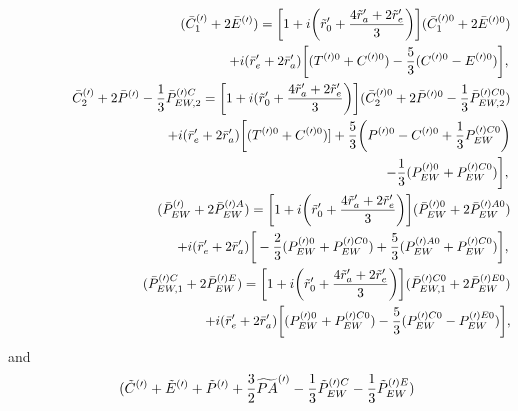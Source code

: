 \documentclass[aps,preprint,floats,epsf,epsfig,nofootinbib,letter]{revtex4}
\newcommand{\be}{\begin{eqnarray}}
\newcommand{\en}{\end{eqnarray}}
\newcommand{\non}{{\nonumber}}
\begin{document}
\begin{eqnarray}
\non\\
&&(\bar C^{(\prime)}_1+2\bar E^{(\prime)})
=\bigg[1+i\bigg(\tilde r'_0 +\frac{4\tilde r'_a +2\tilde r'_e}{3}\bigg)\bigg](\bar C^{(\prime)0}_1+2\bar E^{(\prime)0})
\non\\
&&\qquad\qquad\qquad\quad
+i(\bar r'_e+2\bar r'_a) \bigg[(T^{(\prime)0}+C^{(\prime)0})-\frac{5}{3}(C^{(\prime)0}- E^{(\prime)0})\bigg],
\non\\
%
&&
\bar C^{(\prime)}_2+2\bar P^{(\prime)}-\frac{1}{3}\bar P^{(\prime)C}_{EW,2}
=\bigg[1+i(\tilde r'_0 +\frac{4\tilde r'_a +2\tilde r'_e}{3}\bigg)\bigg]
(\bar C^{(\prime)0}_2+2\bar P^{(\prime)0}-\frac{1}{3}\bar P^{(\prime)C0}_{EW,2})
\non\\
&&\qquad\qquad\qquad\qquad\qquad\quad
+i(\bar r'_e+2\bar r'_a) \bigg[(T^{(\prime)0}+C^{(\prime)0})]
+\frac{5}{3} \bigg(P^{(\prime)0}-C^{(\prime)0}+\frac{1}{3}P^{(\prime)C0}_{EW}\bigg)
\non\\
&&\qquad\qquad\qquad\qquad\qquad\quad
-\frac{1}{3} (P^{(\prime)0}_{EW}+P^{(\prime)C0}_{EW})\bigg],
\non\\
&&(\bar P^{(\prime)}_{EW} +2\bar P^{(\prime)A}_{EW})
=
\bigg[1+i\bigg(\tilde r'_0 +\frac{4\tilde r'_a +2\tilde r'_e}{3}\bigg)\bigg]
(\bar P^{(\prime)0}_{EW} +2\bar P^{(\prime)A0}_{EW})
\non\\
&&\qquad\qquad\qquad\qquad
+i(\bar r'_e+2\bar r'_a)\bigg[-\frac{2}{3} (P^{(\prime)0}_{EW}+P^{(\prime)C0}_{EW})+\frac{5}{3} (P^{(\prime)A0}_{EW}+P^{(\prime)C0}_{EW})\bigg],
\non\\
&&(\bar P^{(\prime)C}_{EW,1}+2\bar P^{(\prime)E}_{EW})
=
\bigg[1+i\bigg(\tilde r'_0 +\frac{4\tilde r'_a +2\tilde r'_e}{3}\bigg)\bigg]
(\bar P^{(\prime)C0}_{EW,1}  +2\bar P^{(\prime)E0}_{EW})
\non\\
&&\qquad\qquad\qquad\qquad
+
i(\bar r'_e+2\bar r'_a) \bigg[(P^{(\prime)0}_{EW}+P^{(\prime)C0}_{EW})-\frac{5}{3} (P^{(\prime)C0}_{EW}-P^{(\prime)E0}_{EW})\bigg],
\label{eq: rcombinations2}
\en
and
\be
&&(\tilde C^{(\prime)}+\tilde E^{(\prime)}+\tilde P^{(\prime)}+\frac{3}{2}\widetilde {PA}^{(\prime)}-\frac{1}{3}\tilde P^{(\prime)C}_{EW} -\frac{1}{3}\tilde P^{(\prime)E}_{EW})
\non\\

\end{eqnarray}
\end{document}
